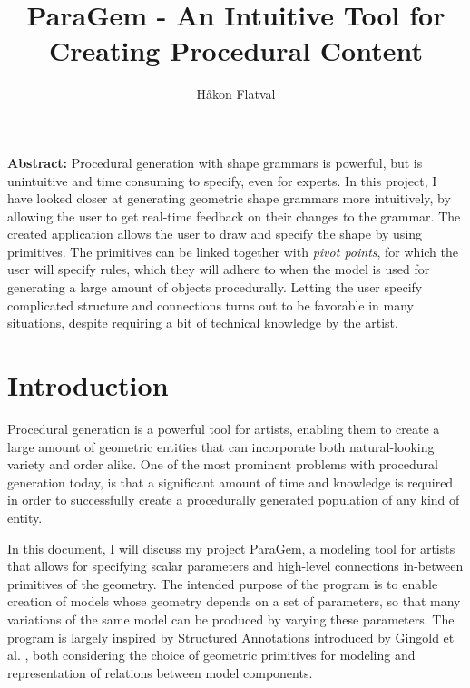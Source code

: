 \documentclass[english]{article}
\begin{document}
\title{ParaGem - An Intuitive Tool for Creating Procedural Content}

\author{Håkon Flatval}

\maketitle
\thispagestyle{fancy}

\begin{center}

  {\bf Abstract:} Procedural generation with shape grammars is powerful, but is unintuitive and time consuming to specify, even for experts. In this project, I have looked closer at generating geometric shape grammars more intuitively, by allowing the user to get real-time feedback on their changes to the grammar. The created application allows the user to draw and specify the shape by using primitives. The primitives can be linked together with \textit{pivot points}, for which the user will specify rules, which they will adhere to when the model is used for generating a large amount of objects procedurally. Letting the user specify complicated structure and connections turns out to be favorable in many situations, despite requiring a bit of technical knowledge by the artist.
  
\end{center}

\section{Introduction}

Procedural generation is a powerful tool for artists, enabling them to create a large amount of geometric entities that can incorporate both natural-looking variety and order alike. One of the most prominent problems with procedural generation today, is that a significant amount of time and knowledge is required in order to successfully create a procedurally generated population of any kind of entity.

In this document, I will discuss my project ParaGem, a modeling tool for artists that allows for specifying scalar parameters and high-level connections in-between primitives of the geometry. The intended purpose of the program is to enable creation of models whose geometry depends on a set of parameters, so that many variations of the same model can be produced by varying these parameters. The program is largely inspired by Structured Annotations introduced by  Gingold et al. \cite{gingold09}, both considering the choice of geometric primitives for modeling and representation of relations between model components.
\end{document}
